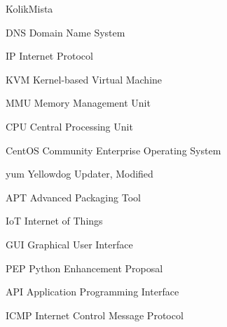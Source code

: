 \begin{seznamzkratek}{KolikMista}

		{DNS}
		{Domain Name System}
		
		{IP}
		{Internet Protocol}
		
		{KVM}
		{Kernel-based Virtual Machine}
		
		{MMU}
		{Memory Management Unit}
		
		{CPU}
		{Central Processing Unit}
		
		{CentOS}
		{Community Enterprise Operating System}


		{yum}
		{Yellowdog Updater, Modified}

		{APT}
		{Advanced Packaging Tool}
		
		{IoT}
		{Internet of Things}

		{GUI}
		{Graphical User Interface}
		
		{PEP}
		{Python Enhancement Proposal}	
		
		{API}
		{Application Programming Interface}		
		
		{ICMP}
		{Internet Control Message Protocol}		

\end{seznamzkratek}
